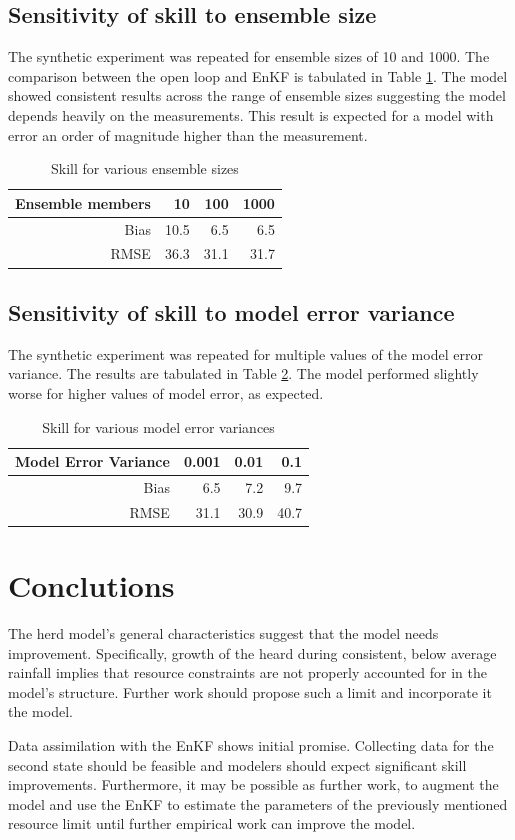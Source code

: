 \documentclass[fleqn, letterpaper]{article}
\numberwithin{figure}{section}
\begin{document}
\subsection{Sensitivity of skill to ensemble size}
The synthetic experiment was repeated for ensemble sizes of 10 and 1000. The comparison between the open loop and EnKF is tabulated in Table \ref{ensize}. The model showed consistent results across the range of ensemble sizes suggesting the model depends heavily on the measurements. This result is expected for a model with error an order of magnitude higher than the measurement.
\begin{table}
\begin{tabular}{rrrr}
Ensemble members & 10 & 100 & 1000 \\
\hline
Bias & 10.5 & 6.5 & 6.5 \\
RMSE & 36.3 & 31.1 & 31.7
\end{tabular}
\label{ensize}
\caption{Skill for various ensemble sizes}
\end{table}

\subsection{Sensitivity of skill to model error variance}
The synthetic experiment was repeated for multiple values of the model error variance. The results are tabulated in Table \ref{error}. The model performed slightly worse for higher values of model error, as expected.
\begin{table}
\begin{tabular}{rrrr}
Model Error Variance & 0.001 & 0.01 & 0.1 \\
\hline
Bias & 6.5 & 7.2 & 9.7\\
RMSE & 31.1 & 30.9 & 40.7
\end{tabular}
\caption{Skill for various model error variances}
\label{error}
\end{table}

\section{Conclutions}
The herd model's general characteristics suggest that the model needs improvement.
Specifically, growth of the heard during consistent, below average rainfall implies that resource constraints are not properly accounted for in the model's structure.
Further work should propose such a limit and incorporate it the model.

Data assimilation with the EnKF shows initial promise. Collecting data for the second state should be feasible and modelers should expect significant skill improvements. Furthermore, it may be possible as further work, to augment the model and use the EnKF to estimate the parameters of the previously mentioned resource limit until further empirical work can improve the model.




\end{document}
